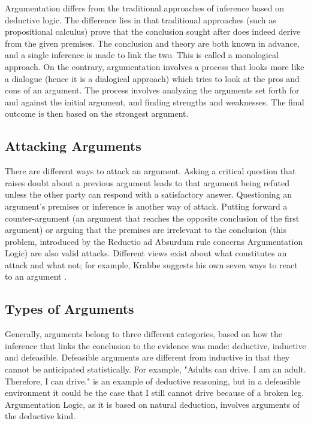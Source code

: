 \documentclass[11pt,twoside,a4paper]{report}
\begin{document}
Argumentation differs from the traditional approaches of inference based on deductive logic. The difference lies in that traditional approaches (such as propositional calculus) prove that the conclusion sought after does indeed derive from the given premises. The conclusion and theory are both known in advance, and a single inference is made to link the two. This is called a monological approach. On the contrary, argumentation involves a process that looks more like a dialogue (hence it is a dialogical approach) which tries to look at the pros and cons of an argument. The process involves analyzing the arguments set forth for and against the initial argument, and finding strengths and weaknesses. The final outcome is then based on the strongest argument.

\subsection{Attacking Arguments}
There are different ways to attack an argument. Asking a critical question that raises doubt about a previous argument leads to that argument being refuted unless the other party can respond with a satisfactory answer. Questioning an argument's premises or inference is another way of attack. Putting forward a counter-argument (an argument that reaches the opposite conclusion of the first argument) or arguing that the premises are irrelevant to the conclusion (this problem, introduced by the Reductio ad Absurdum rule concerns Argumentation Logic) are also valid attacks. Different views exist about what constitutes an attack and what not; for example, Krabbe suggests his own seven ways to react to an argument \citep*{reasonreclaimed}.

\subsection{Types of Arguments}
Generally, arguments belong to three different categories, based on how the inference that links the conclusion to the evidence was made: deductive, inductive and defeasible. Defeasible arguments are different from inductive in that they cannot be anticipated statistically. For example, "Adults can drive. I am an adult. Therefore, I can drive." is an example of deductive reasoning, but in a defeasible environment it could be the case that I still cannot drive because of a broken leg. Argumentation Logic, as it is based on natural deduction, involves arguments of the deductive kind.
\end{document}
